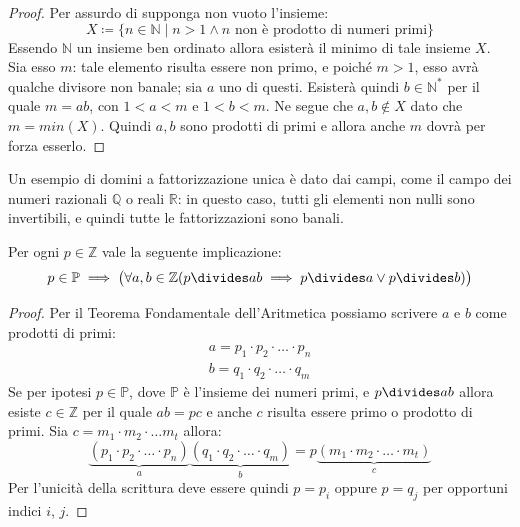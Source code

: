 \begin{proof}
	Per assurdo di supponga non vuoto l'insieme:
	\begin{displaymath}
		X \coloneqq \{n \in \mathbb{N} \; | \; n > 1 \land \text{$n$ non è prodotto di numeri primi}\}
	\end{displaymath}
	Essendo $\mathbb{N}$ un insieme ben ordinato allora esisterà il minimo di tale insieme $X$. Sia esso $m$: tale elemento risulta essere non primo, e poiché $m>1$, esso avrà qualche divisore non banale; sia $a$ uno di questi. Esisterà quindi $b \in \mathbb{N}^{*}$ per il quale $m=ab$, con $1<a<m$ e $1<b<m$. Ne segue che $a,b \notin X$ dato che $m= min(X)$. Quindi $a,b$ sono prodotti di primi e allora anche $m$ dovrà per forza esserlo.
\end{proof}

\begin{example}
	Un esempio di domini a fattorizzazione unica è dato dai campi, come il campo dei numeri razionali $\mathbb{Q}$ o reali $\mathbb {R}$: in questo caso, tutti gli elementi non nulli sono invertibili, e quindi tutte le fattorizzazioni sono banali. 
\end{example}

\begin{lemmabox}[di Gauss]
	Per ogni $p \in \mathbb{Z}$ vale la seguente implicazione:
	\begin{displaymath}
		p \in \mathbb{P} \implies \bigl(\forall a,b \in \mathbb{Z}(p \divides ab \implies p \divides a \lor p \divides b)\bigr)
	\end{displaymath}
\end{lemmabox}

\begin{proof}
	Per il Teorema Fondamentale dell'Aritmetica possiamo scrivere $a$ e $b$ come prodotti di primi:
	\begin{displaymath}
		\begin{array}{l}
			a=p_{1}\cdot p_{2}\cdot \ldots \cdot p_{n}\\
			b=q_{1}\cdot q_{2} \cdot \ldots \cdot q_{m}
		\end{array}
	\end{displaymath}
	Se per ipotesi $p \in \mathbb{P}$, dove $\mathbb{P}$ è l'insieme dei numeri primi, e $p \divides ab$ allora esiste $c \in \mathbb{Z}$ per il quale $ab = pc$ e anche $c$ risulta essere primo o prodotto di primi. Sia $c=m_{1}\cdot m_{2} \cdot \ldots m_{t}$ allora:
	\begin{displaymath}
		\underbrace{(p_{1}\cdot p_{2}\cdot \ldots \cdot p_{n})}_{a}\underbrace{(q_{1}\cdot q_{2} \cdot \ldots \cdot q_{m})}_{b} = p \underbrace{(m_{1}\cdot m_{2} \cdot \ldots \cdot m_{t})}_{c}
	\end{displaymath}
	Per l'unicità della scrittura deve essere quindi $p = p_{i}$ oppure $p=q_{j}$ per opportuni indici $i$, $j$.
\end{proof}

